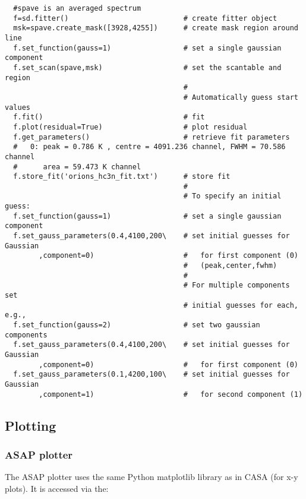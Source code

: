 \small
\begin{verbatim}
  #spave is an averaged spectrum
  f=sd.fitter()                           # create fitter object
  msk=spave.create_mask([3928,4255])      # create mask region around line
  f.set_function(gauss=1)                 # set a single gaussian component
  f.set_scan(spave,msk)                   # set the scantable and region
                                          # 
                                          # Automatically guess start values
  f.fit()                                 # fit 
  f.plot(residual=True)                   # plot residual
  f.get_parameters()                      # retrieve fit parameters
  #   0: peak = 0.786 K , centre = 4091.236 channel, FWHM = 70.586 channel
  #      area = 59.473 K channel
  f.store_fit('orions_hc3n_fit.txt')      # store fit
                                          #
                                          # To specify an initial guess:
  f.set_function(gauss=1)                 # set a single gaussian component
  f.set_gauss_parameters(0.4,4100,200\    # set initial guesses for Gaussian
        ,component=0)                     #   for first component (0)
                                          #   (peak,center,fwhm)
                                          #
                                          # For multiple components set
                                          # initial guesses for each, e.g.,
  f.set_function(gauss=2)                 # set two gaussian components
  f.set_gauss_parameters(0.4,4100,200\    # set initial guesses for Gaussian
        ,component=0)                     #   for first component (0)
  f.set_gauss_parameters(0.1,4200,100\    # set initial guesses for Gaussian
        ,component=1)                     #   for second component (1)

\end{verbatim}
\normalsize

\subsection{Plotting}
\label{subsection:sd.asap.plotting}

\subsubsection{ASAP plotter}
The ASAP plotter uses the same Python matplotlib library as in CASA
(for x-y plots). It is accessed via the: 

